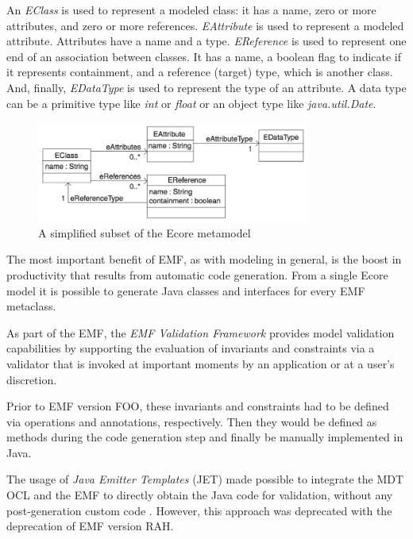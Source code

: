 \documentclass[
	10pt,				%
	oneside,
	a4paper,			%
	brazil,
	english
	]{abntex2}
\begin{document}
An \emph{EClass} is used to represent a modeled class: it has a name, zero or more
attributes, and zero or more references.
\emph{EAttribute} is used to represent a modeled attribute. Attributes have a
name and a type.
\emph{EReference} is used to represent one end of an association between classes.
It has a name, a boolean flag to indicate if it represents containment, and a
reference (target) type, which is another class.
And, finally, \emph{EDataType} is used to represent the type of an attribute.
A data type can be a primitive type like \emph{int} or \emph{float} or an object
type like \emph{java.util.Date}.

\begin{figure}
\includegraphics[width=0.8\textwidth]{images/ecore_fragment}
\caption{A simplified subset of the Ecore metamodel \protect\cite{budinsky09}}
\label{fig:ecore_fragment}
\end{figure}


The most important benefit of EMF, as with modeling in general, is the boost in
productivity that results from automatic code generation. From a single Ecore
model it is possible to generate Java classes and interfaces for every EMF metaclass.

As part of the EMF, the \emph{EMF Validation Framework} provides model validation
capabilities by supporting the evaluation of invariants and constraints via a
validator that is invoked at important moments by an application or at a user's
discretion. \cite{emf_helios_nn}

Prior to EMF version FOO, these invariants and constraints had to be defined
via operations and annotations, respectively. \cite[Chapter~18]{budinsky09}
Then they would be defined as methods during the code generation step and finally
be manually implemented in Java.


The usage of \emph{Java Emitter Templates} (JET) made possible to integrate the
MDT OCL and the EMF to directly obtain the Java code for validation,
without any post-generation custom code \cite{damus07}.
However, this approach was deprecated with the deprecation of EMF version RAH.
\end{document}
